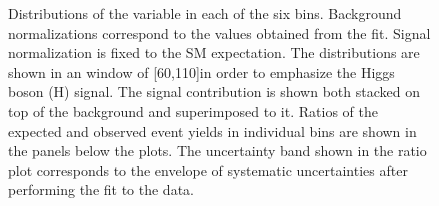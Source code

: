 \begin{figure}[htbp]
{}
\caption{Distributions of the \mll variable in each of the six \pth bins. Background normalizations correspond to the values obtained from the fit. Signal normalization is fixed to the SM expectation. The distributions are shown in an \mt window of [60,110]\GeV in order to emphasize the Higgs boson (H) signal. The signal contribution is shown both stacked on top of the background and superimposed to it. Ratios of the expected and observed event yields in individual bins are shown in the panels below the plots. The uncertainty band shown in the ratio plot corresponds to the envelope of systematic uncertainties after performing the fit to the data.}\label{fig:mllSignalRegion}
\end{figure}

